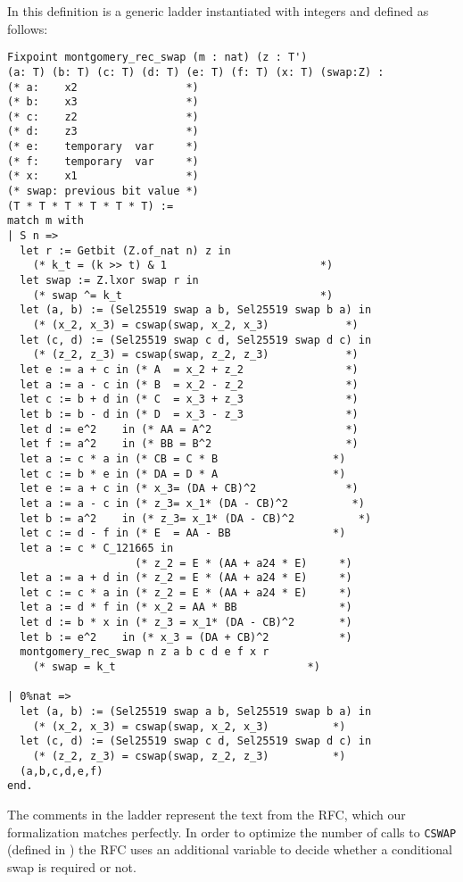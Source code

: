 In this definition  is a generic ladder instantiated
with integers and defined as follows:
\begin{lstlisting}[language=Coq]
Fixpoint montgomery_rec_swap (m : nat) (z : T')
(a: T) (b: T) (c: T) (d: T) (e: T) (f: T) (x: T) (swap:Z) :
(* a:    x2                 *)
(* b:    x3                 *)
(* c:    z2                 *)
(* d:    z3                 *)
(* e:    temporary  var     *)
(* f:    temporary  var     *)
(* x:    x1                 *)
(* swap: previous bit value *)
(T * T * T * T * T * T) :=
match m with
| S n =>
  let r := Getbit (Z.of_nat n) z in
    (* k_t = (k >> t) & 1                        *)
  let swap := Z.lxor swap r in
    (* swap ^= k_t                               *)
  let (a, b) := (Sel25519 swap a b, Sel25519 swap b a) in
    (* (x_2, x_3) = cswap(swap, x_2, x_3)            *)
  let (c, d) := (Sel25519 swap c d, Sel25519 swap d c) in
    (* (z_2, z_3) = cswap(swap, z_2, z_3)            *)
  let e := a + c in (* A  = x_2 + z_2                *)
  let a := a - c in (* B  = x_2 - z_2                *)
  let c := b + d in (* C  = x_3 + z_3                *)
  let b := b - d in (* D  = x_3 - z_3                *)
  let d := e^2    in (* AA = A^2                     *)
  let f := a^2    in (* BB = B^2                     *)
  let a := c * a in (* CB = C * B                  *)
  let c := b * e in (* DA = D * A                  *)
  let e := a + c in (* x_3= (DA + CB)^2              *)
  let a := a - c in (* z_3= x_1* (DA - CB)^2          *)
  let b := a^2    in (* z_3= x_1* (DA - CB)^2          *)
  let c := d - f in (* E  = AA - BB                *)
  let a := c * C_121665 in
                    (* z_2 = E * (AA + a24 * E)     *)
  let a := a + d in (* z_2 = E * (AA + a24 * E)     *)
  let c := c * a in (* z_2 = E * (AA + a24 * E)     *)
  let a := d * f in (* x_2 = AA * BB                *)
  let d := b * x in (* z_3 = x_1* (DA - CB)^2       *)
  let b := e^2    in (* x_3 = (DA + CB)^2           *)
  montgomery_rec_swap n z a b c d e f x r
    (* swap = k_t                              *)

| 0%nat =>
  let (a, b) := (Sel25519 swap a b, Sel25519 swap b a) in
    (* (x_2, x_3) = cswap(swap, x_2, x_3)          *)
  let (c, d) := (Sel25519 swap c d, Sel25519 swap d c) in
    (* (z_2, z_3) = cswap(swap, z_2, z_3)          *)
  (a,b,c,d,e,f)
end.
\end{lstlisting}

The comments in the ladder represent the text from the RFC, which
our formalization matches perfectly. In order to optimize the
number of calls to \texttt{CSWAP} (defined in )
the RFC uses an additional variable to decide whether a conditional swap
is required or not.

